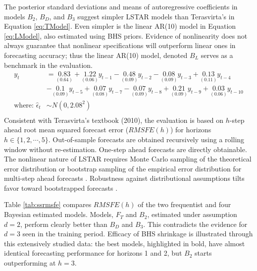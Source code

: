 The posterior standard deviations and means of autoregressive coefficients in models $B_2$, $B_D$, and $B_3$ suggest simpler LSTAR models than Terasvirta's in Equation \ref{eq:TModel}. Even simpler is the linear AR(10) model in Equation \ref{eq:LModel}, also estimated using BHS priors. Evidence of nonlinearity does not always guarantee that nonlinear specifications will outperform linear ones in forecasting accuracy\citep{Montgomery1998,Terasvirta2005}; thus the linear AR(10) model, denoted $B_{L}$ serves as a benchmark in the evaluation.
\begin{equation}
\begin{split}
 	y_t &=\underset{(0.64)}{0.83}+\underset{(0.06)}{1.22}y_{t-1}-\underset{(0.09)}{0.48}y_{t-2}-\underset{(0.09)}{0.08}y_{t-3}+\underset{(0.11)}{0.13}y_{t-4}\\
 	&-\underset{(0.09)}{0.1}y_{t-5}+\underset{(0.08)}{0.07}y_{t-7}-\underset{(0.09)}{0.07}y_{t-8}+\underset{(0.09)}{0.21}y_{t-9}+\underset{(0.06)}{0.03}y_{t-10}\\
 	\textrm{where: } \hat{\epsilon}_t &\sim N(0, 2.08^2)\\
\end{split}
\label{eq:LModel}
\end{equation}
Consistent with Terasvirta's textbook (2010), the evaluation is based on $h$-step ahead root mean squared forecast error ($RMSFE(h)$) for horizons $h \in \{1,2,\cdots,5\}$. Out-of-sample forecasts are obtained recursively using a rolling window without re-estimation. One-step ahead forecasts are directly obtainable. The nonlinear nature of LSTAR requires Monte Carlo sampling of the theoretical error distribution \citep{Peguin1994} or bootstrap sampling of the empirical error distribution for multi-step ahead forecasts \citep{Dijk2002,Lundbergh2002}. Robustness against distributional assumptions tilts favor toward bootstrapped forecasts \citep{Lin1994}. 

Table \ref{tab:ssrmsfe} compares $RMSFE(h)$ of the two frequentist  and four Bayesian estimated models. Models, $F_T$ and $B_2$, estimated under assumption $d=2$, perform clearly better than $B_D$ and $B_3$. This contradicts the evidence for $d=3$ seen in the training period. Efficacy of BHS shrinkage is illustrated through this extensively studied data: the best models, highlighted in bold, have almost identical forecasting performance for horizons 1 and 2, but $B_2$ starts outperforming at $h=3$. 

